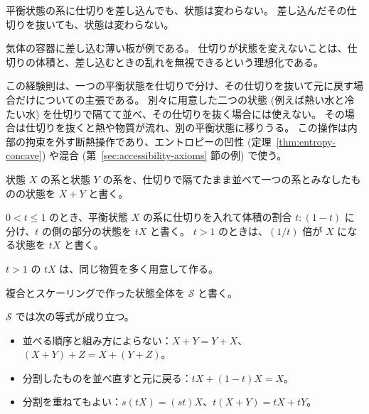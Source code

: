 \begin{empirical}[仕切りは状態を変えない]
  \label{emp:partition}
  平衡状態の系に仕切りを差し込んでも、状態は変わらない。
  差し込んだその仕切りを抜いても、状態は変わらない。
\end{empirical}

気体の容器に差し込む薄い板が例である。
仕切りが状態を変えないことは、仕切りの体積と、差し込むときの乱れを無視できるという理想化である。

この経験則は、一つの平衡状態を仕切りで分け、その仕切りを抜いて元に戻す場合だけについての主張である。
別々に用意した二つの状態 (例えば熱い水と冷たい水) を仕切りで隔てて並べ、その仕切りを抜く場合には使えない。
その場合は仕切りを抜くと熱や物質が流れ、別の平衡状態に移りうる。
この操作は内部の拘束を外す断熱操作であり、エントロピーの凹性 (定理~\ref{thm:entropy-concave}) や混合 (第~\ref{sec:accessibility-axioms} 節の例) で使う。

\begin{definition}[複合]
  \label{def:composite}
  状態 $X$ の系と状態 $Y$ の系を、仕切りで隔てたまま並べて一つの系とみなしたものの状態を $X + Y$ と書く。
\end{definition}

\begin{definition}[スケーリング]
  \label{def:scaling}
  $0 < t \le 1$ のとき、平衡状態 $X$ の系に仕切りを入れて体積の割合 $t : (1-t)$ に分け、$t$ の側の部分の状態を $tX$ と書く。
  $t > 1$ のときは、$(1/t)$ 倍が $X$ になる状態を $tX$ と書く。
\end{definition}

$t > 1$ の $tX$ は、同じ物質を多く用意して作る。

\begin{definition}[状態の空間]
  \label{def:state-space}
  複合とスケーリングで作った状態全体を $\mathcal{S}$ と書く。
\end{definition}

\begin{empirical}[複合とスケーリングの法則]
  \label{emp:state-space}
  \leanok
  $\mathcal{S}$ では次の等式が成り立つ。
  \begin{itemize}
    \item 並べる順序と組み方によらない：$X + Y = Y + X$、$(X + Y) + Z = X + (Y + Z)$。
    \item 分割したものを並べ直すと元に戻る：$tX + (1-t)X = X$。
    \item 分割を重ねてもよい：$s(tX) = (st)X$、$t(X + Y) = tX + tY$。
  \end{itemize}
\end{empirical}

